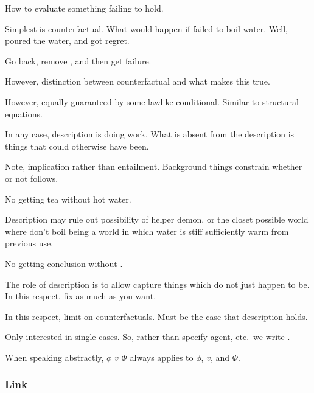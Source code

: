 \begin{note}
  How to evaluate something failing to hold.

  Simplest is counterfactual.
  What would happen if failed to boil water.
  Well, poured the water, and got regret.

  Go back, remove \ros{}, and then get failure.

  However, distinction between counterfactual and what makes this true.

  However, equally guaranteed by some lawlike conditional.
  Similar to structural equations.

  In any case, description is doing work.
  What is absent from the description is things that could otherwise have been.

  Note, implication rather than entailment.
  Background things constrain whether or not follows.

  No getting tea without hot water.

  Description may rule out possibility of helper demon, or the closet possible world where don't boil being a world in which water is stiff sufficiently warm from previous use.

  No getting conclusion without \ros{}.
\end{note}

\begin{note}
  The role of description is to allow capture things which do not just happen to be.
  In this respect, fix as much as you want.

  In this respect, limit on counterfactuals.
  Must be the case that description holds.
\end{note}

\begin{note}
  \begin{notation}
    Only interested in single cases.
    So, rather than specify agent, etc.\ we write \qWhyV{}.

    When speaking abstractly, \(\phi\) \(v\) \(\Phi\) \qWhyV{} always applies to \(\phi\), \(v\), and \(\Phi\).
  \end{notation}
\end{note}


\subsubsection{Link}
\label{cha:var:sec:vars:qwhyvnp:link}

